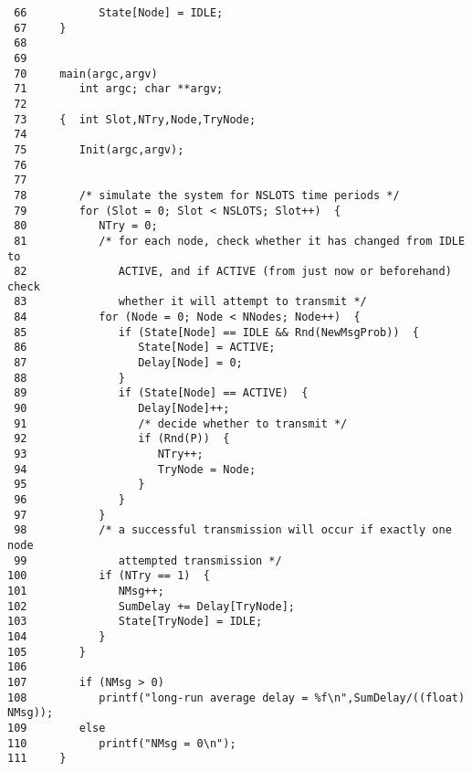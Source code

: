 \documentclass[11pt]{article}
\begin{document}
\begin{verbatim}
 66           State[Node] = IDLE;
 67     }
 68     
 69     
 70     main(argc,argv)
 71        int argc; char **argv;
 72     
 73     {  int Slot,NTry,Node,TryNode;  
 74     
 75        Init(argc,argv);
 76     
 77     
 78        /* simulate the system for NSLOTS time periods */
 79        for (Slot = 0; Slot < NSLOTS; Slot++)  {
 80           NTry = 0;
 81           /* for each node, check whether it has changed from IDLE to
 82              ACTIVE, and if ACTIVE (from just now or beforehand) check
 83              whether it will attempt to transmit */
 84           for (Node = 0; Node < NNodes; Node++)  {
 85              if (State[Node] == IDLE && Rnd(NewMsgProb))  {
 86                 State[Node] = ACTIVE;
 87                 Delay[Node] = 0;
 88              }
 89              if (State[Node] == ACTIVE)  { 
 90                 Delay[Node]++;
 91                 /* decide whether to transmit */
 92                 if (Rnd(P))  {
 93                    NTry++;
 94                    TryNode = Node;
 95                 }
 96              }
 97           }
 98           /* a successful transmission will occur if exactly one node
 99              attempted transmission */
100           if (NTry == 1)  {
101              NMsg++;
102              SumDelay += Delay[TryNode];
103              State[TryNode] = IDLE;
104           }
105        }
106     
107        if (NMsg > 0)
108           printf("long-run average delay = %f\n",SumDelay/((float) NMsg));
109        else
110           printf("NMsg = 0\n");
111     }
\end{verbatim}
\end{document}
